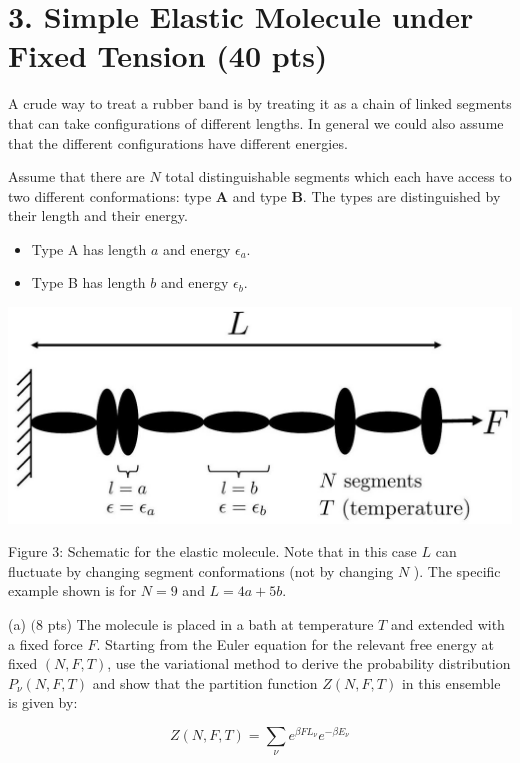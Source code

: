 \documentclass[10pt]{article}
\begin{document}
\section*{3. Simple Elastic Molecule under Fixed Tension (40 pts)}
A crude way to treat a rubber band is by treating it as a chain of linked segments that can take configurations of different lengths. In general we could also assume that the different configurations have different energies.

Assume that there are $N$ total distinguishable segments which each have access to two different conformations: type $\mathbf{A}$ and type $\mathbf{B}$. The types are distinguished by their length and their energy.

\begin{itemize}
  \item Type A has length $a$ and energy $\epsilon_{a}$.
  \item Type B has length $b$ and energy $\epsilon_{b}$.
\end{itemize}

\begin{center}
\includegraphics[max width=\textwidth]{2024_02_03_75704bce2caff28cbfb1g-5}
\end{center}

Figure 3: Schematic for the elastic molecule. Note that in this case $L$ can fluctuate by changing segment conformations (not by changing $N$ ). The specific example shown is for $N=9$ and $L=4 a+5 b$.

(a) $(8$ pts) The molecule is placed in a bath at temperature $T$ and extended with a fixed force $F$. Starting from the Euler equation for the relevant free energy at fixed $(N, F, T)$, use the variational method to derive the probability distribution $P_{\nu}(N, F, T)$ and show that the partition function $Z(N, F, T)$ in this ensemble is given by:

$$
Z(N, F, T)=\sum_{\nu} e^{\beta F L_{\nu}} e^{-\beta E_{\nu}}
$$
\end{document}
